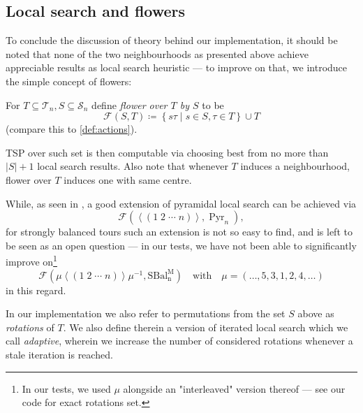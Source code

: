 \documentclass[titlepage,twoside,index=totoc,bibliography=totoc]{scrartcl}
\numberwithin{equation}{section}
\numberwithin{figure}{section}
\numberwithin{table}{section}
\let\defstyle\itshape
\begin{document}
\subsection{Local search and flowers}

To conclude the discussion of theory behind our implementation, it should
be noted that none of the two neighbourhoods as presented above achieve
appreciable results as local search heuristic --- to improve on that, we
introduce the simple concept of flowers:

\begin{define}
  For $T \subseteq \mathcal{T}_n, S \subseteq \mathcal{S}_n$ define
  {\defstyle flower over $T$ by $S$} to be
  \[
    \mathcal{F}\left(S,T\right) \coloneqq
    \left\{ s \tau \mid s \in S, \tau \in T\right\} \cup T
  \]
  (compare this to \cref{def:actions}).
\end{define}

TSP over such set is then computable via choosing best from no
more than $\left|S\right|+1$ local search results.  Also note that whenever
$T$ induces a neighbourhood, flower over $T$ induces one with same centre.

While, as seen in \cite{belperm}, a good extension of pyramidal local
search can be achieved via
\[
  \mathcal{F}\left(
    \left<\left( 1\;2\;\cdots\;n\right)\right>,
    \operatorname{Pyr}_n
  \right),
\]
for strongly balanced tours such an extension is not so easy to find,
and is left to be seen as an open question ---
in our tests, we have not been able to significantly improve
on\footnote{%
  In our tests, we used $\mu$ alongside an "interleaved" version thereof --- see our code for exact rotations set.
}
\[
  \mathcal{F}\left(
  \mu
  \left<\left( 1\;2\;\cdots\;n\right)\right>
    \mu^{-1},
    \operatorname{SBal_n^M}
  \right)
  \quad \text{with} \quad
  \mu = \left(\ldots , 5, 3, 1, 2, 4, \ldots\right)
\]
in this regard.

In our implementation we also refer to permutations from the set $S$ above
as {\defstyle rotations} of $T$.
We also define therein a version of iterated local search which we call
{\defstyle adaptive}, wherein we increase the number of considered rotations
whenever a stale iteration is reached.
\end{document}
